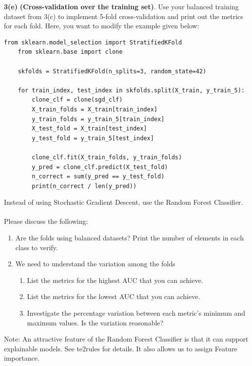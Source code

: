 \documentclass[11pt]{article}
\begin{document}
	\textbf{3(e)} \textbf{(Cross-validation over the training set)}. Use your balanced training dataset from 3(c) to implement 5-fold
	cross-validation and print out the metrics for each fold. Here, you want to modify the example given below:
	
	\begin{lstlisting}[style=matlabstyle]
	from sklearn.model_selection import StratifiedKFold
	from sklearn.base import clone
				
	skfolds = StratifiedKFold(n_splits=3, random_state=42)
				
	for train_index, test_index in skfolds.split(X_train, y_train_5):
		clone_clf = clone(sgd_clf)
		X_train_folds = X_train[train_index]
		y_train_folds = y_train_5[train_index]
		X_test_fold = X_train[test_index]
		y_test_fold = y_train_5[test_index]
		
		clone_clf.fit(X_train_folds, y_train_folds)
		y_pred = clone_clf.predict(X_test_fold)
		n_correct = sum(y_pred == y_test_fold)
		print(n_correct / len(y_pred))
	\end{lstlisting}
	
	Instead of using Stochastic Gradient Descent, use the Random Forest Classifier.\\\\
	
	Please discuss the following:
	
	\begin{enumerate}[label=\roman*.]
		\item Are the folds using balanced datasets? Print the number of elements in each class to verify.
		
		\item We need to understand the variation among the folds
			\begin{enumerate}
				\item List the metrics for the highest AUC that you can achieve.
				\item List the metrics for the lowest AUC that you can achieve.
				\item Investigate the percentage variation between each metric’s minimum and maximum values. Is the variation
				reasonable?
			\end{enumerate}
	\end{enumerate}
	
	Note: An attractive feature of the Random Forest Classifier is that it can support explainable models. See	te2rules for details. It also allows us to assign Feature importance.\\
	
\end{document}
